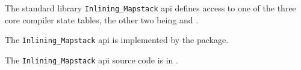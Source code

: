 
The standard library {\tt Inlining\_Mapstack} api defines access to one of the three 
core compiler state tables, the other two being 
 and 
.

The {\tt Inlining\_Mapstack} api is implemented by the  package.

The {\tt Inlining\_Mapstack} api source code is in .







